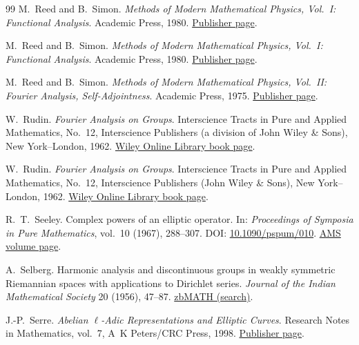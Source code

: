 \documentclass{article}
\numberwithin{equation}{section}
\theoremstyle{plain}
\theoremstyle{definition}
\theoremstyle{remark}
\begin{document}
\begin{thebibliography}{99}
M.~Reed and B.~Simon.
\newblock \emph{Methods of Modern Mathematical Physics, Vol.~I: Functional Analysis}.
\newblock Academic Press, 1980.
\newblock \href{https://www.elsevier.com/books/methods-of-modern-mathematical-physics/reed/978-0-12-585050-6}{Publisher page}.

M.~Reed and B.~Simon.
\newblock \emph{Methods of Modern Mathematical Physics, Vol.~I: Functional Analysis}.
\newblock Academic Press, 1980.
\newblock \href{https://www.elsevier.com/books/methods-of-modern-mathematical-physics/reed/978-0-12-585050-6}{Publisher page}.

M.~Reed and B.~Simon.
\newblock \emph{Methods of Modern Mathematical Physics, Vol.~II: Fourier Analysis, Self-Adjointness}.
\newblock Academic Press, 1975.
\newblock \href{https://www.elsevier.com/books/methods-of-modern-mathematical-physics/reed/978-0-12-585002-5}{Publisher page}.

W.~Rudin.
\newblock \emph{Fourier Analysis on Groups}.
\newblock Interscience Tracts in Pure and Applied Mathematics, No.~12, Interscience Publishers (a division of John Wiley \& Sons), New York--London, 1962.
\newblock \href{https://onlinelibrary.wiley.com/doi/book/10.1002/9781118165621}{Wiley Online Library book page}.

W.~Rudin.
\newblock \emph{Fourier Analysis on Groups}.
\newblock Interscience Tracts in Pure and Applied Mathematics, No.~12, Interscience Publishers (John Wiley \& Sons), New York--London, 1962.
\newblock \href{https://onlinelibrary.wiley.com/doi/book/10.1002/9781118165621}{Wiley Online Library book page}.


R.~T.~Seeley.
\newblock Complex powers of an elliptic operator.
\newblock In: \emph{Proceedings of Symposia in Pure Mathematics}, vol.~10 (1967), 288--307.
\newblock DOI:
\href{https://doi.org/10.1090/pspum/010}{10.1090/pspum/010}.
\newblock \href{https://www.ams.org/books/pspum/010/}{AMS volume page}.

A.~Selberg.
\newblock Harmonic analysis and discontinuous groups in weakly symmetric Riemannian spaces with applications to Dirichlet series.
\newblock \emph{Journal of the Indian Mathematical Society} 20 (1956), 47--87.
\newblock \href{https://zbmath.org/}{zbMATH (search)}.

J.-P.~Serre.
\newblock \emph{Abelian $\ell$-Adic Representations and Elliptic Curves}.
\newblock Research Notes in Mathematics, vol.~7, A~K Peters/CRC Press, 1998.
\newblock \href{https://www.routledge.com/Abelian-l-Adic-Representations-and-Elliptic-Curves/Serre/p/book/9780429063015}{Publisher page}.



\end{thebibliography}
\end{document}
